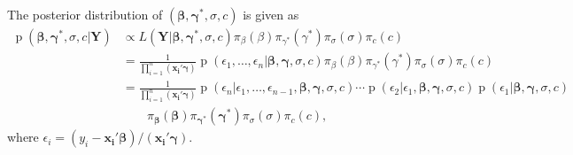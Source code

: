 \documentclass[12pt]{article}
\DeclareMathOperator{\pr}{p}
\begin{document}
The posterior distribution of $(\bm{\beta}, \bm{\gamma^{*}}, \sigma, c)$
is given as
\begin{equation}\label{ch2:eq:post}
  \begin{aligned}
    \pr(\bm{\beta}, \bm{\gamma^{*}}, \sigma, c|\bm{Y}) & \propto L(\bm{Y}|
    \bm{\beta}, \bm{\gamma^{*}}, \sigma, c) \pi_{\beta}(\beta)
    \pi_{\gamma^{*}}(\gamma^{*}) \pi_{\sigma}(\sigma) \pi_c(c) \\
    & = \frac{1}{\prod_{i=1}^n (\bm{x_i'\gamma})} \pr \left(
      \epsilon_1, \ldots, \epsilon_n | \bm{\beta}, \bm{\gamma},
      \sigma, c\right) \pi_{\beta}(\beta)
    \pi_{\gamma^{*}}(\gamma^{*}) \pi_{\sigma}(\sigma) \pi_c(c) \\
    & = \frac{1}{\prod_{i=1}^n (\bm{x_i'\gamma})} \pr
    \left(\epsilon_n| \epsilon_1, \ldots, \epsilon_{n-1}, \bm{\beta},
      \bm{\gamma}, \sigma, c\right) \cdots \pr \left(\epsilon_2|
      \epsilon_1, \bm{\beta}, \bm{\gamma}, \sigma, c\right) \pr
    \left(\epsilon_1| \bm{\beta}, \bm{\gamma},
      \sigma, c\right)\\
    & \qquad \pi_{\bm{\beta}}(\bm{\beta})
    \pi_{\bm{\gamma}^{*}}(\bm{\gamma}^{*}) \pi_{\sigma}(\sigma) \pi_c(c),
  \end{aligned}
\end{equation}
where $\epsilon_i = (y_i - \bm{x_i'\beta})/(\bm{x_i'\gamma})$.
\end{document}
